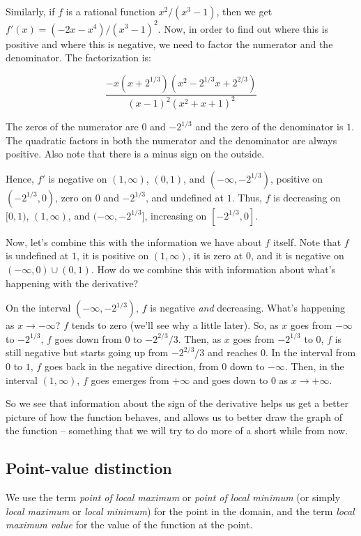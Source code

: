 \documentclass[10pt]{amsart}
\begin{document}
Similarly, if $f$ is a rational function $x^2/(x^3 - 1)$, then we get
$f'(x) = (-2x - x^4)/(x^3 - 1)^2$. Now, in order to find out where
this is positive and where this is negative, we need to factor the
numerator and the denominator. The factorization is:

$$\frac{-x(x + 2^{1/3})(x^2 - 2^{1/3}x + 2^{2/3})}{(x - 1)^2(x^2 + x + 1)^2}$$

The zeros of the numerator are $0$ and $-2^{1/3}$ and the zero of the
denominator is $1$. The quadratic factors in both the numerator and
the denominator are always positive. Also note that there is a minus
sign on the outside.

Hence, $f'$ is negative on $(1,\infty)$, $(0,1)$, and
$(-\infty,-2^{1/3})$, positive on $(-2^{1/3},0)$, zero on $0$ and
$-2^{1/3}$, and undefined at $1$. Thus, $f$ is decreasing on $[0,1)$,
$(1,\infty)$, and $(-\infty,-2^{1/3}]$, increasing on $[-2^{1/3},0]$.

Now, let's combine this with the information we have about $f$
itself. Note that $f$ is undefined at $1$, it is positive on
$(1,\infty)$, it is zero at $0$, and it is negative on $(-\infty,0)
\cup (0,1)$. How do we combine this with information about what's
happening with the derivative?

On the interval $(-\infty,-2^{1/3})$, $f$ is negative {\em and}
decreasing. What's happening as $x \to -\infty$? $f$ tends to zero
(we'll see why a little later). So, as $x$ goes from $-\infty$ to
$-2^{1/3}$, $f$ goes down from $0$ to $-2^{2/3}/3$. Then, as $x$ goes
from $-2^{1/3}$ to $0$, $f$ is still negative but starts going up from
$-2^{2/3}/3$ and reaches $0$. In the interval from $0$ to $1$, $f$
goes back in the negative direction, from $0$ down to $-\infty$. Then,
in the interval $(1,\infty)$, $f$ goes emerges from $+\infty$ and goes
down to $0$ as $x \to +\infty$.

So we see that information about the sign of the derivative helps us
get a better picture of how the function behaves, and allows us to
better draw the graph of the function -- something that we will try to
do more of a short while from now.

\subsection*{Point-value distinction}

We use the term {\em point of local maximum} or {\em point of local
minimum} (or simply {\em local maximum} or {\em local minimum}) for
the point in the domain, and the term {\em local maximum value} for
the value of the function at the point.
\end{document}
